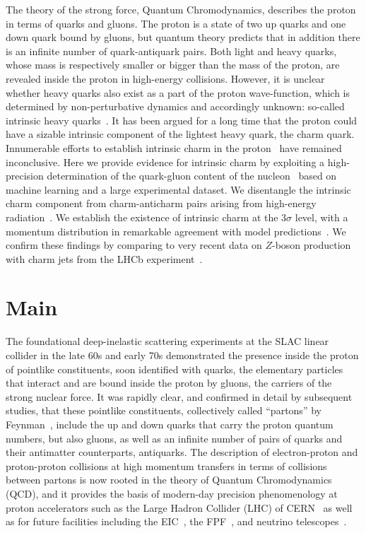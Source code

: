 \documentclass[11pt,a4paper]{article}
\begin{document}
\noindent

The theory of the strong  force, Quantum
Chromodynamics, describes 
the proton in terms of quarks and gluons.
The proton is a state of 
two up quarks and one down quark bound by gluons, but quantum
theory predicts 
that in addition there is an infinite number of
quark-antiquark pairs.
%
Both light and heavy quarks, whose   mass is respectively smaller or
bigger than the mass of the
proton, are  revealed inside the proton in high-energy collisions.
%
However, it is unclear whether
heavy quarks also exist as a part of the proton
wave-function, which is  determined by
non-perturbative dynamics and accordingly unknown:
so-called intrinsic heavy quarks~\cite{Brodsky:1980pb}.
It has been
argued for a long time that the proton could have a sizable
intrinsic component of the lightest  heavy
quark, the charm quark.
Innumerable efforts to establish
intrinsic charm in the
proton~\cite{Brodsky:2015fna} have remained inconclusive.
%
Here we provide 
evidence for intrinsic
charm by exploiting  
a high-precision determination of the quark-gluon content of
the nucleon~\cite{Ball:2021leu} based on 
machine learning and a large experimental dataset.
%
We disentangle the intrinsic charm component from charm-anticharm pairs 
arising from high-energy radiation~\cite{Ball:2015tna}.
We establish the existence of intrinsic charm at the  $3\sigma$ level,
with a
momentum distribution in remarkable agreement
with model predictions~\cite{Brodsky:1980pb,Hobbs:2013bia}.
%
We confirm these findings by
comparing to very recent 
data on $Z$-boson production with charm jets  from
the LHCb experiment~\cite{LHCb:2021stx}. 

\section*{Main}

The foundational deep-inelastic scattering experiments at the SLAC linear collider
in the late 60s and early 70s demonstrated the presence inside the
proton of pointlike  constituents, soon identified with quarks, the
elementary particles that interact and are bound inside the proton by
gluons, the carriers of the strong  nuclear force.
%
It was rapidly clear, and confirmed in detail by subsequent studies,
that these pointlike constituents, collectively called ``partons'' by
Feynman~\cite{Feynman:1969wa}, include the up and down quarks that
carry the proton quantum numbers, but also gluons, as well
as an infinite number of pairs of quarks and their
antimatter counterparts, antiquarks.
%
The description of electron-proton and proton-proton collisions at high
momentum transfers in terms of collisions between partons is now
rooted in the theory of Quantum  Chromodynamics (QCD), and it provides
the basis
of modern-day precision phenomenology at proton accelerators such as
the Large Hadron Collider
(LHC) of CERN~\cite{Gao:2017yyd} as well
as for future facilities including the
EIC~\cite{AbdulKhalek:2021gbh},
the FPF~\cite{Feng:2022inv},
and  
neutrino telescopes~\cite{IceCube-Gen2:2020qha}.
\end{document}
